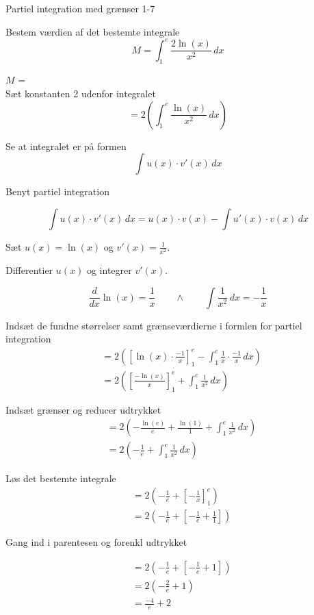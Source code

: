 \documentclass{article}
\begin{document}
\newpage

\begin{exercise}{Partiel integration med grænser 1-7}
	
	
	Bestem værdien af det bestemte integrale
	\[
	M = \int_1^e \frac{2 \ln(x)}{x^2}  \, dx
	\]
	
	$M$ =  \\
	
	\hint
	Sæt konstanten 2 udenfor integralet
	\[
	= 2 \left( \int_1^e \frac{\ln(x)}{x^2}  \, dx	\right)
	\]
	
	\hint
	
	Se at integralet er på formen
	\[
	\int u(x) \cdot v'(x) \, dx
	\]
	
	\hint
	
	Benyt partiel integration
	
	\hint
	\[
	\int u(x) \cdot v'(x)\, dx = u(x) \cdot v(x) - \int u'(x) \cdot v(x) \, dx
	\]
	\hint
	
	Sæt $u(x) = \ln(x)$ og $v'(x) = \frac{1}{x^2}$.
	
	
	\hint
	
	Differentier $u(x)$ og integrer $v'(x)$.
	
	\hint
	\[
	\frac{d}{dx} \ln(x) = \frac{1}{x} \qquad \wedge \qquad \int \frac{1}{x^2} \, dx = - \frac{1}{x}
	\]
	
	\hint
	
	Indsæt de fundne størrelser samt grænseværdierne i formlen for partiel integration 
	\begin{align*}
	&= 2 \left( \left[\ln(x) \cdot \frac{-1}{x} \right]_{1}^{e} - \int_{1}^{e} \frac{1}{x} \cdot \frac{-1}{x} \, dx \right) \\
	&=2 \left( \left[\frac{-\ln(x)}{x} \right]_{1}^{e} + \int_{1}^{e} \frac{1}{x^2} \, dx \right)
	\end{align*}
	
	\hint
	
	Indsæt grænser og reducer udtrykket
	\begin{align*}	
	&= 2 \left( -\frac{\ln(e)}{e} +\frac{\ln(1)}{1}  + \int_{1}^{e} \frac{1}{x^2} \, dx \right) \\
	&=2 \left( -\frac{1}{e}  + \int_{1}^{e} \frac{1}{x^2} \, dx \right)
	\end{align*}
	
	\hint
	Løs det bestemte integrale
	\begin{align*}
	&= 2 \left( -\frac{1}{e}  + \left[- \frac{1}{x}	\right]_1^e	\right)  \\
	&=  2 \left( -\frac{1}{e}  + \left[- \frac{1}{e} + \frac{1}{1}	\right]\right) 
	\end{align*}
	
	\hint
	Gang ind i parentesen og forenkl udtrykket
	
	\hint
	\begin{align*}
	&=  2 \left( -\frac{1}{e}  + \left[- \frac{1}{e} +  1	\right]\right) \\
	&= 2 \left( -\frac{2}{e} +  1\right) \\
	&= \frac{-4}{e} + 2 
	\end{align*}
	
	
	
\end{exercise}
\end{document}
